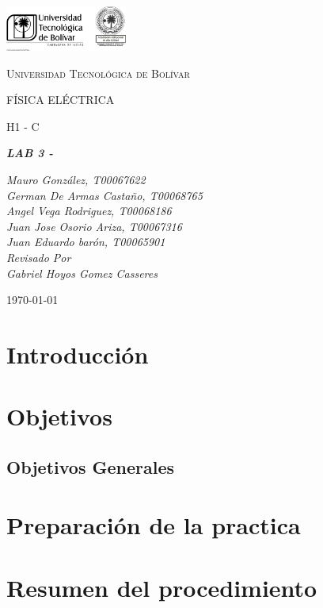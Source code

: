 \documentclass[twocolumn, 12pt]{article}
\begin{document}
\begin{titlepage}
	\centering
	\includegraphics[width=0.3\textwidth]{Images/logo_utb.png}\par\vspace{1cm}
	{\scshape\LARGE Universidad Tecnológica de Bolívar \par}
	\vspace{1cm}

	{\scshape\Large FÍSICA ELÉCTRICA \par}
	\vspace{.2cm}

	{\scshape\Large H1 - C \par}
	\vspace{1cm}
	\slshape {\Large \bfseries{} LAB 3 -   \\}
	\vspace{1cm}

	\slshape {\itshape{} Mauro González, T00067622 \\}
	\slshape {\itshape{} German De Armas Castaño, T00068765 \\}
	\slshape {\itshape{} Angel Vega Rodriguez, T00068186 \\}
	\slshape {\itshape{} Juan Jose Osorio Ariza, T00067316 \\}
	\slshape {\itshape{} Juan Eduardo barón, T00065901 \\}
	\vfill
	Revisado Por \\
	Gabriel Hoyos Gomez Casseres\\
	{\large \today\par}
\end{titlepage}

\section{Introducción}


\newpage

\section{Objetivos}

\subsection{Objetivos Generales}

\newpage

\section{Preparación de la practica}

\section{Resumen del procedimiento}


\newpage

\end{document}
